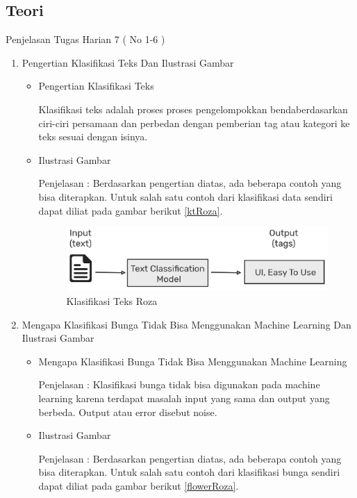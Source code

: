 \subsection{Teori}
Penjelasan Tugas Harian 7 ( No 1-6 )
\begin{enumerate}
\item Pengertian Klasifikasi Teks Dan Ilustrasi Gambar
\begin{itemize}
\item Pengertian Klasifikasi Teks
\par Klasifikasi teks adalah proses proses pengelompokkan bendaberdasarkan ciri-ciri persamaan dan perbedan dengan pemberian tag atau kategori ke teks sesuai dengan isinya. 
\par
\item Ilustrasi Gambar
\par Penjelasan : Berdasarkan pengertian diatas, ada beberapa contoh yang bisa diterapkan. Untuk salah satu contoh dari klasifikasi data sendiri dapat diliat pada gambar berikut \ref{ktRoza}.
\begin{figure}[!hbtp]
\centering
\includegraphics[scale=0.3]{figures/ktRoza.png}
\caption{Klasifikasi Teks Roza}
\label{text-fadila}
\end{figure}
\par
\end{itemize}
\par
\par
\item Mengapa Klasifikasi Bunga Tidak Bisa Menggunakan Machine Learning Dan Ilustrasi Gambar
\begin{itemize}
\item  Mengapa Klasifikasi Bunga Tidak Bisa Menggunakan Machine Learning
\par Penjelasan : Klasifikasi bunga tidak bisa digunakan pada machine learning karena terdapat masalah input yang sama dan output yang berbeda. Output atau error disebut noise.
\par
\item Ilustrasi Gambar
\par Penjelasan : Berdasarkan pengertian diatas, ada beberapa contoh yang bisa diterapkan. Untuk salah satu contoh dari klasifikasi bunga sendiri dapat diliat pada gambar berikut \ref{flowerRoza}.

\end{itemize}
\end{enumerate}
